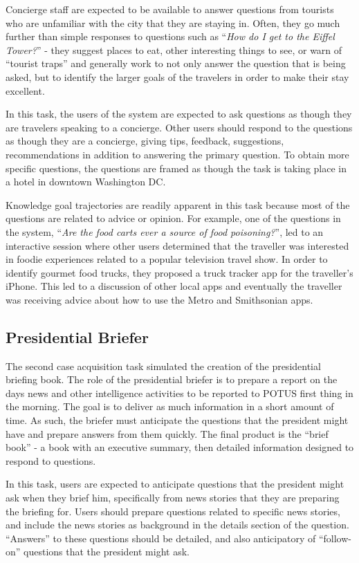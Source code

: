 \documentclass[11pt,letterpaper]{article}
\begin{document}
Concierge staff are expected to be available to answer questions from tourists who are unfamiliar with the city that they are staying in. Often, they go much further than simple responses to questions such as ``\textit{How do I get to the Eiffel Tower?}'' - they suggest places to eat, other interesting things to see, or warn of ``tourist traps'' and generally work to not only answer the question that is being asked, but to identify the larger goals of the travelers in order to make their stay excellent.

In this task, the users of the system are expected to ask questions as though they are travelers speaking to a concierge. Other users should respond to the questions as though they are a concierge, giving tips, feedback, suggestions, recommendations in addition to answering the primary question. To obtain more specific questions, the questions are framed as though the task is taking place in a hotel in downtown Washington DC.

Knowledge goal trajectories are readily apparent in this task because most of the questions are related to advice or opinion. For example, one of the questions in the system, ``\textit{Are the food carts ever a source of food poisoning?}'', led to an interactive session where other users determined that the traveller was interested in foodie experiences related to a popular television travel show. In order to identify gourmet food trucks, they proposed a truck tracker app for the traveller's iPhone. This led to a discussion of other local apps and eventually the traveller was receiving advice about how to use the Metro and Smithsonian apps.

\subsection{Presidential Briefer}

The second case acquisition task simulated the creation of the presidential briefing book. The role of the presidential briefer is to prepare a report on the days news and other intelligence activities to be reported to POTUS first thing in the morning. The goal is to deliver as much information in a short amount of time. As such, the briefer must anticipate the questions that the president might have and prepare answers from them quickly. The final product is the ``brief book'' - a book with an executive summary, then detailed information designed to respond to questions.

In this task, users are expected to anticipate questions that the president might ask when they brief him, specifically from news stories that they are preparing the briefing for. Users should prepare questions related to specific news stories, and include the news stories as background in the details section of the question. ``Answers'' to these questions should be detailed, and also anticipatory of ``follow-on'' questions that the president might ask.
\end{document}
